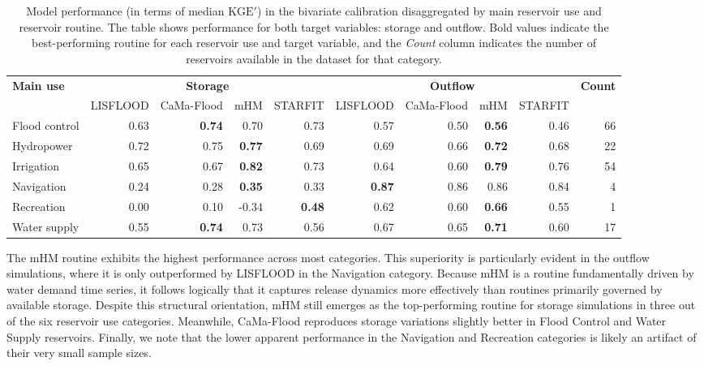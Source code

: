 \documentclass[hess, manuscript]{copernicus}
\newcommand{\KGEmod}{$\text{KGE}'$}
\begin{document}
\begin{table}[t]
    \centering
    \small
    \begin{tabular}{l rrrr @{\hspace{0.7cm}} rrrr @{\hspace{0.7cm}} r}
        \toprule
         \textbf{Main use}  & \multicolumn{4}{c}{\textbf{Storage}} & \multicolumn{4}{c}{\textbf{Outflow}} & \textbf{Count}\\
          & LISFLOOD & CaMa-Flood & mHM & STARFIT & LISFLOOD & CaMa-Flood & mHM & STARFIT & \\
         \midrule
        Flood control & 0.63 & \textbf{0.74} & 0.70 & 0.73 & 0.57 & 0.50 & \textbf{0.56} & 0.46 & 66 \\
        Hydropower    & 0.72 & 0.75 & \textbf{0.77} & 0.69 & 0.69 & 0.66 & \textbf{0.72} & 0.68 & 22 \\
        Irrigation    & 0.65 & 0.67 & \textbf{0.82} & 0.73 & 0.64 & 0.60 & \textbf{0.79} & 0.76 & 54 \\
        Navigation    & 0.24 & 0.28 & \textbf{0.35} & 0.33 & \textbf{0.87} & 0.86 & 0.86 & 0.84 & 4  \\
        Recreation    & 0.00 & 0.10 & -0.34 & \textbf{0.48} & 0.62 & 0.60 & \textbf{0.66} & 0.55 & 1  \\
        Water supply  & 0.55 & \textbf{0.74} & 0.73 & 0.56 & 0.67 & 0.65 & \textbf{0.71} & 0.60 & 17 \\
        \bottomrule
    \end{tabular}
    \caption{Model performance (in terms of median \KGEmod) in the bivariate calibration disaggregated by main reservoir use and reservoir routine. The table shows performance for both target variables: storage and outflow. Bold values indicate the best-performing routine for each reservoir use and target variable, and the \textit{Count} column indicates the number of reservoirs available in the dataset for that category.}
    \label{tab:kge_use}
\end{table}

The mHM routine exhibits the highest performance across most categories. This superiority is particularly evident in the outflow simulations, where it is only outperformed by LISFLOOD in the Navigation category. Because mHM is a routine fundamentally driven by water demand time series, it follows logically that it captures release dynamics more effectively than routines primarily governed by available storage. Despite this structural orientation, mHM still emerges as the top-performing routine for storage simulations in three out of the six reservoir use categories. Meanwhile, CaMa-Flood reproduces storage variations slightly better in Flood Control and Water Supply reservoirs. Finally, we note that the lower apparent performance in the Navigation and Recreation categories is likely an artifact of their very small sample sizes.
\end{document}
